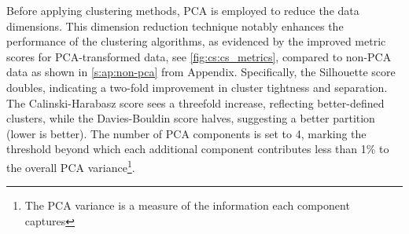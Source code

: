 Before applying clustering methods, \gls{PCA} is employed to reduce the data dimensions. This dimension reduction technique notably enhances the performance of the clustering algorithms, as evidenced by the improved metric scores for PCA-transformed data, see  \cref{fig:cs:cs_metrics}, compared to non-PCA data as shown in \cref{s:ap:non-pca} from Appendix. Specifically, the Silhouette score doubles, indicating a two-fold improvement in cluster tightness and separation. The Calinski-Harabasz score sees a threefold increase, reflecting better-defined clusters, while the Davies-Bouldin score halves, suggesting a better partition (lower is better). The number of PCA components is set to 4, marking the threshold beyond which each additional component contributes less than 1\% to the overall PCA variance\footnote{The PCA variance is a measure of the information each component captures}.

